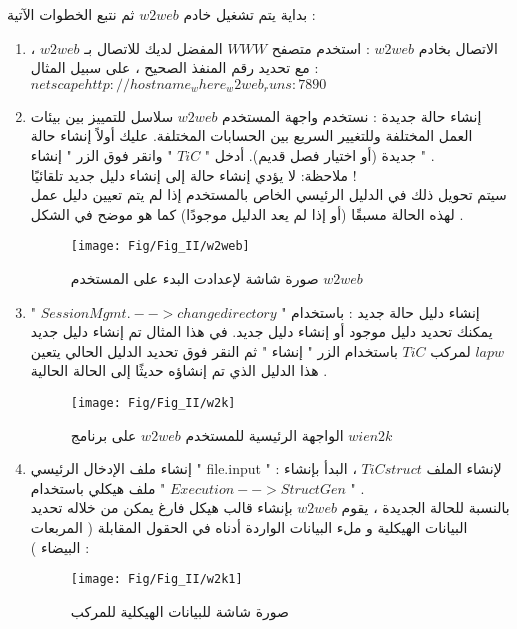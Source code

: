 بداية يتم تشغيل خادم $ w2web $ ثم نتبع الخطوات الآتية :
\begin{enumerate}
	\item 
	الاتصال بخادم $ w2web $ : استخدم متصفح $ WWW $ المفضل لديك للاتصال بـ $ w2web $ ، مع تحديد رقم المنفذ الصحيح ، على سبيل المثال : \\
	$ netscape http://hostname_where_w2web_runs:7890 $
	
	\item 
	إنشاء حالة جديدة : نستخدم واجهة المستخدم $ w2web $ سلاسل للتمييز بين بيئات العمل المختلفة وللتغيير السريع بين الحسابات المختلفة. عليك أولاً إنشاء حالة جديدة  (أو اختيار فصل قديم). أدخل " $ TiC $ " وانقر فوق الزر "  إنشاء " .\\
	ملاحظة: لا يؤدي إنشاء حالة إلى إنشاء دليل جديد تلقائيًا !	\\
	سيتم تحويل ذلك في الدليل الرئيسي الخاص بالمستخدم إذا لم يتم تعيين دليل عمل لهذه الحالة مسبقًا (أو إذا لم يعد الدليل موجودًا) كما هو موضح في الشكل .
	
	\begin{figure}[h!]
		\centering
		\texttt{[image: Fig/Fig\_II/w2web]}
		\caption{ صورة شاشة لإعدادت البدء على المستخدم $ w2web $  }
		\label{fig:w2web}
	\end{figure}
	\FloatBarrier
	
	\item 
	إنشاء دليل حالة جديد : باستخدام "  $ 	Session Mgmt.--> change directory    $  " يمكنك تحديد دليل موجود أو إنشاء دليل جديد. في هذا المثال تم إنشاء دليل جديد $ lapw $ لمركب $ TiC  $ باستخدام الزر " إنشاء " ثم النقر فوق تحديد الدليل الحالي يتعين هذا الدليل الذي تم إنشاؤه حديثًا إلى الحالة الحالية .
	
	\begin{figure}[h!]
		\centering
		\texttt{[image: Fig/Fig\_II/w2k]}
		\caption{ 	الواجهة الرئيسية للمستخدم $ w2web $ على برنامج $ wien2k $ }
		\label{fig:w2k}
	\end{figure}
	\FloatBarrier

	\item 
	إنشاء ملف الإدخال الرئيسي " file.input " : لإنشاء الملف $ TiCstruct $ ، البدأ بإنشاء ملف هيكلي باستخدام " $ Execution --> StructGen $ "  .\\
	بالنسبة للحالة الجديدة ، يقوم $ w2web $ بإنشاء قالب هيكل فارغ يمكن من خلاله تحديد البيانات الهيكلية و ملء البيانات الواردة أدناه في الحقول المقابلة ( المربعات البيضاء ) :
	
	\begin{figure}[h!]
		\centering
		\texttt{[image: Fig/Fig\_II/w2k1]}
		\caption{  صورة شاشة للبيانات الهيكلية للمركب }
		\label{fig:w2k1}
	\end{figure}
	\FloatBarrier
	

\end{enumerate}
